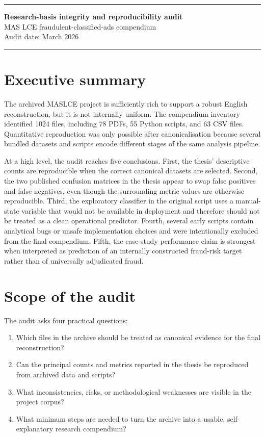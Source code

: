 \documentclass[11pt,a4paper]{article}
\begin{document}
{\color{accent}\rule{\textwidth}{1.2pt}}
\begin{center}
    {\LARGE\bfseries Research-basis integrity and reproducibility audit}\\[0.4em]
    {\large MAS LCE fraudulent-classified-ads compendium}\\[0.8em]
    {\normalsize Audit date: March 2026}
\end{center}
{\color{accent}\rule{\textwidth}{0.6pt}}

\section*{Executive summary}
The archived MASLCE project is sufficiently rich to support a robust English reconstruction, but it is not internally uniform. The compendium inventory identified 1024 files, including 78 PDFs, 55 Python scripts, and 63 CSV files. Quantitative reproduction was only possible after canonicalisation because several bundled datasets and scripts encode different stages of the same analysis pipeline.

At a high level, the audit reaches five conclusions. First, the thesis' descriptive counts are reproducible when the correct canonical datasets are selected. Second, the two published confusion matrices in the thesis appear to swap false positives and false negatives, even though the surrounding metric values are otherwise reproducible. Third, the exploratory classifier in the original script uses a manual-state variable that would not be available in deployment and therefore should not be treated as a clean operational predictor. Fourth, several early scripts contain analytical bugs or unsafe implementation choices and were intentionally excluded from the final compendium. Fifth, the case-study performance claim is strongest when interpreted as prediction of an internally constructed fraud-risk target rather than of universally adjudicated fraud.

\newpage

\tableofcontents

\newpage

\section{Scope of the audit}
The audit asks four practical questions:
\begin{enumerate}[leftmargin=1.5em]
    \item Which files in the archive should be treated as canonical evidence for the final reconstruction?
    \item Can the principal counts and metrics reported in the thesis be reproduced from archived data and scripts?
    \item What inconsistencies, risks, or methodological weaknesses are visible in the project corpus?
    \item What minimum steps are needed to turn the archive into a usable, self-explanatory research compendium?
\end{enumerate}
\end{document}
